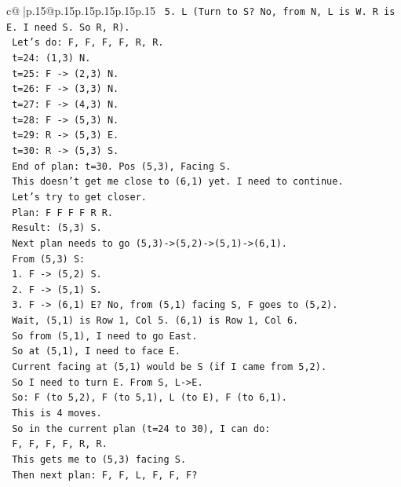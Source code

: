 \documentclass{article}
\begin{document}
{\begin{supertabular}{c@{$\;$}|p{.15\linewidth}@{}p{.15\linewidth}p{.15\linewidth}p{.15\linewidth}p{.15\linewidth}p{.15\linewidth}}
{{{\texttt{   5. L (Turn to S? No, from N, L is W. R is E. I need S. So R, R).} \\
\texttt{      Let's do: F, F, F, F, R, R.} \\
\texttt{      t=24: (1,3) N.} \\
\texttt{      t=25: F {-}> (2,3) N.} \\
\texttt{      t=26: F {-}> (3,3) N.} \\
\texttt{      t=27: F {-}> (4,3) N.} \\
\texttt{      t=28: F {-}> (5,3) N.} \\
\texttt{      t=29: R {-}> (5,3) E.} \\
\texttt{      t=30: R {-}> (5,3) S.} \\
\texttt{      End of plan: t=30. Pos (5,3), Facing S.} \\
\texttt{   This doesn't get me close to (6,1) yet. I need to continue.} \\
\texttt{   Let's try to get closer.} \\
\texttt{   Plan: F F F F R R.} \\
\texttt{   Result: (5,3) S.} \\
\texttt{   Next plan needs to go (5,3){-}>(5,2){-}>(5,1){-}>(6,1).} \\
\texttt{   From (5,3) S:} \\
\texttt{   1. F {-}> (5,2) S.} \\
\texttt{   2. F {-}> (5,1) S.} \\
\texttt{   3. F {-}> (6,1) E? No, from (5,1) facing S, F goes to (5,2).} \\
\texttt{   Wait, (5,1) is Row 1, Col 5. (6,1) is Row 1, Col 6.} \\
\texttt{   So from (5,1), I need to go East.} \\
\texttt{   So at (5,1), I need to face E.} \\
\texttt{   Current facing at (5,1) would be S (if I came from 5,2).} \\
\texttt{   So I need to turn E. From S, L{-}>E.} \\
\texttt{   So: F (to 5,2), F (to 5,1), L (to E), F (to 6,1).} \\
\texttt{   This is 4 moves.} \\
\texttt{   So in the current plan (t=24 to 30), I can do:} \\
\texttt{   F, F, F, F, R, R.} \\
\texttt{   This gets me to (5,3) facing S.} \\
\texttt{   Then next plan: F, F, L, F, F, F?} \\
}}}
\end{supertabular}}
\end{document}
